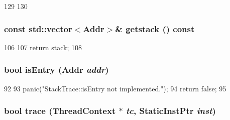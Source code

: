 \begin{DoxyCode}
129     {
130     }
\end{DoxyCode}
\hypertarget{classPowerISA_1_1StackTrace_aceb93ba31a3756aca859b4643efeeb46}{
\subsubsection[{getstack}]{\setlength{\rightskip}{0pt plus 5cm}const {\bf std::vector}$<${\bf Addr}$>$\& getstack () const}}
\label{classPowerISA_1_1StackTrace_aceb93ba31a3756aca859b4643efeeb46}



\begin{DoxyCode}
106     {
107         return stack;
108     }
\end{DoxyCode}
\hypertarget{classPowerISA_1_1StackTrace_a8c9787d05f9c0e82dfcaf31cf0fd4b50}{
\subsubsection[{isEntry}]{\setlength{\rightskip}{0pt plus 5cm}bool isEntry ({\bf Addr} {\em addr})}}
\label{classPowerISA_1_1StackTrace_a8c9787d05f9c0e82dfcaf31cf0fd4b50}



\begin{DoxyCode}
92 {
93     panic("StackTrace::isEntry not implemented.\n");
94     return false;
95 }
\end{DoxyCode}
\hypertarget{classPowerISA_1_1StackTrace_aabb136846a5e22007e44db846652ddd5}{
\subsubsection[{trace}]{\setlength{\rightskip}{0pt plus 5cm}bool trace ({\bf ThreadContext} $\ast$ {\em tc}, \/  {\bf StaticInstPtr} {\em inst})}}
\label{classPowerISA_1_1StackTrace_aabb136846a5e22007e44db846652ddd5}



